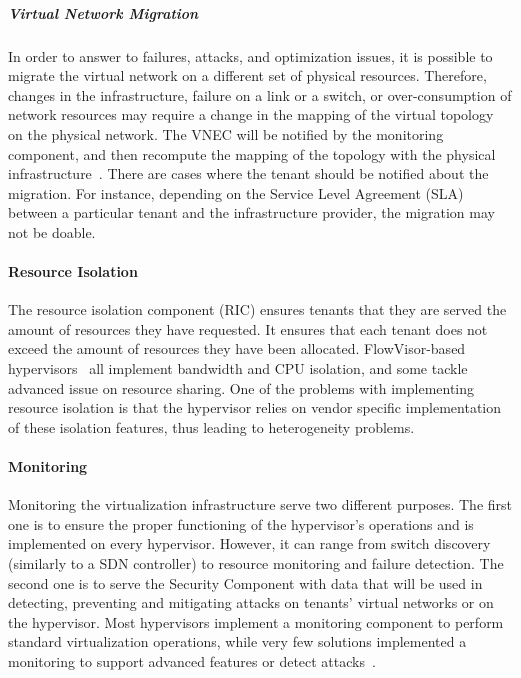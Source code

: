 \subparagraph{Virtual Network Migration}
In order to answer to failures, attacks, and optimization issues, it is possible to migrate the virtual network on a different set of physical resources. 
Therefore, changes in the infrastructure, failure on a link or a switch, or over-consumption of network resources may require a change in the mapping of the virtual topology on the physical network.
The VNEC will be notified by the monitoring component, and then recompute the mapping of the topology with the physical infrastructure~\cite{VeRTIGO-Corin2012a,AutoSlice-Bozakov2012,CoVisor-Jin2015}.
There are cases where the tenant should be notified about the migration.
For instance, depending on the Service Level Agreement (SLA) between a particular tenant and the infrastructure provider, the migration may not be doable.

\paragraph{Resource Isolation}
The resource isolation component (RIC) ensures tenants that they are served the amount of resources they have requested.
It ensures that each tenant does not exceed the amount of resources they have been allocated.
FlowVisor-based hypervisors~\cite{FlowVisor-Sherwood2009,ADVisor-Salvadori2012,VeRTIGO-Corin2012a,EnhancedFV-Min2012,SlicesIsolator-El-Azzab2011,DoubleFV-Yin2013} all implement bandwidth and CPU isolation, and some tackle advanced issue on resource sharing. One of the problems with implementing resource isolation is that the hypervisor relies on vendor specific implementation of these isolation features, thus leading to heterogeneity problems.


\paragraph{Monitoring}
Monitoring the virtualization infrastructure serve two different purposes.
The first one is to ensure the proper functioning of the hypervisor's operations and is implemented on every hypervisor. However, it can range from switch discovery (similarly to a SDN controller) to resource monitoring and failure detection.
The second one is to serve the Security Component with data that will be used in detecting, preventing and mitigating attacks on tenants' virtual networks or on the hypervisor.
Most hypervisors implement a monitoring component to perform standard virtualization operations, while very few solutions implemented a monitoring to support advanced features or detect attacks~\cite{VeRTIGO-Corin2012a,CoVisor-Jin2015,FlowN-Drutskoy2012,AutoSlice-Bozakov2012,NVP-Koponen2014,ONVisor-Han2018}.

